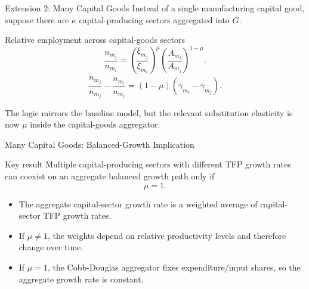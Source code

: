 \begin{frame}{Extension 2: Many Capital Goods}
  \small
  Instead of a single manufacturing capital good, suppose there are $\kappa$
  capital-producing sectors aggregated into $G$.

  \vspace{0.12cm}
  \begin{block}{Relative employment across capital-goods sectors}
    \begin{equation*}
      \frac{n_{m_j}}{n_{m_i}}
      =
      \left(\frac{\xi_{m_j}}{\xi_{m_i}}\right)^\mu
      \left(\frac{A_{m_i}}{A_{m_j}}\right)^{1-\mu}.
    \end{equation*}
    \begin{equation*}
      \frac{\dot n_{m_j}}{n_{m_j}}-\frac{\dot n_{m_i}}{n_{m_i}}
      =(1-\mu)(\gamma_{m_i}-\gamma_{m_j}).
    \end{equation*}
  \end{block}

  \vspace{0.08cm}
  The logic mirrors the baseline model, but the relevant substitution elasticity
  is now $\mu$ inside the capital-goods aggregator.
\end{frame}

\begin{frame}{Many Capital Goods: Balanced-Growth Implication}
  \small
  \begin{alertblock}{Key result}
    Multiple capital-producing sectors with different TFP growth rates can
    coexist on an aggregate balanced growth path only if
    \[
      \mu=1.
    \]
  \end{alertblock}

  \vspace{0.10cm}
  \begin{itemize}
    \item The aggregate capital-sector growth rate is a weighted average of
      capital-sector TFP growth rates.
    \item If $\mu\neq1$, the weights depend on relative productivity levels and
      therefore change over time.
    \item If $\mu=1$, the Cobb-Douglas aggregator fixes expenditure/input shares,
      so the aggregate growth rate is constant.
  \end{itemize}
\end{frame}

